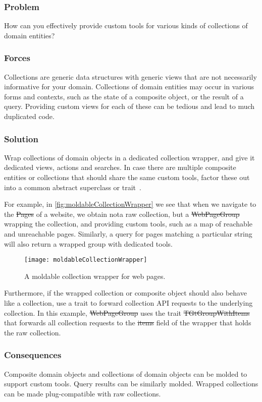 \documentclass[sigconf]{acmart}
\begin{document}
\subsubsection*{Problem}
How can you effectively provide custom tools for various kinds of collections of domain entities?

\subsubsection*{Forces}
Collections are generic data structures with generic views that are not necessarily informative for your domain.
Collections of domain entities may occur in various forms and contexts, such as the state of a composite object, or the result of a query.
Providing custom views for each of these can be tedious and lead to much duplicated code.

\subsubsection*{Solution}
Wrap collections of domain objects in a dedicated collection wrapper, and give it dedicated views, actions and searches.
In case there are multiple composite entities or collections that should share the same custom tools, factor these out into a common abstract superclass or trait~\cite{Duca06b}.

For example, in \autoref{fig:moldableCollectionWrapper} we see that when we navigate to the \st{Pages} of a website, we obtain nota raw collection, but a \st{WebPageGroup} wrapping the collection, and providing custom tools, such as a map of reachable and unreachable pages.
Similarly, a query for pages matching a particular string will also return a wrapped group with dedicated tools.

\begin{figure}[h]
  \texttt{[image: moldableCollectionWrapper]}
  \caption{A moldable collection wrapper for web pages.}
  \label{fig:moldableCollectionWrapper}
\end{figure}

Furthermore, if the wrapped collection or composite object should also behave like a collection, use a trait to forward collection API requests to the underlying collection.
In this example, \st{WebPageGroup} uses the trait \st{TGtGroupWithItems} that forwards all collection requests to the \st{items} field of the wrapper that holds the raw collection.

\subsubsection*{Consequences}
Composite domain objects and collections of domain objects can be molded to support custom tools.
Query results can be similarly molded.
Wrapped collections can be made plug-compatible with raw collections.
\end{document}
